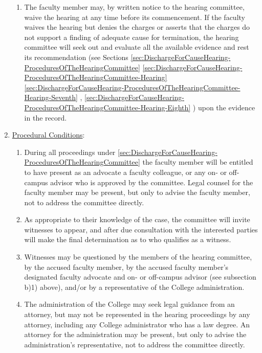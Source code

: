 \begin{enumerate}[label=\alph*)]
{\begin{enumerate}[label=\arabic*)]
								\item{The faculty member may, by written notice to the hearing committee, waive the hearing at any time before its commencement.  If the faculty waives the hearing but denies the charges or asserts that the charges do not support a finding of adequate cause for termination, the hearing committee will seek out and evaluate all the available evidence and rest its recommendation
									(see
									Sections
									\ref{sec:DischargeForCauseHearing-ProceduresOfTheHearingCommittee}
									\ref{sec:DischargeForCauseHearing-ProceduresOfTheHearingCommittee-Hearing}
									\ref{sec:DischargeForCauseHearing-ProceduresOfTheHearingCommittee-Hearing-Seventh}
									,
									\ref{sec:DischargeForCauseHearing-ProceduresOfTheHearingCommittee-Hearing-Eighth}
									)
									upon the evidence in the record.}
							\end{enumerate}
						}
						\item{\underline{Procedural Conditions}:
							\label{sec:DischargeForCauseHearing-ProceduresOfTheHearingCommittee-ProceduralConditions}
							\begin{enumerate}[label=\arabic*)]
								\item{
									\label{sec:DischargeForCauseHearing-ProceduresOfTheHearingCommittee-ProceduralConditions-First}
									During all proceedings under
									\ref{sec:DischargeForCauseHearing-ProceduresOfTheHearingCommittee}
									the faculty member will be entitled to have present as an advocate a faculty colleague, or any on- or off-campus advisor who is approved by the committee.  Legal counsel for the faculty member may be present, but only to advise the faculty member, not to address the committee directly.}
								\item{As appropriate to their knowledge of the case, the committee will invite witnesses to appear, and after due consultation with the interested parties will make the final determination as to who qualifies as a witness.}
								\item{Witnesses may be questioned by the members of the hearing committee, by the accused faculty member, by the accused faculty member's designated faculty advocate and on- or off-campus advisor (see subsection b)1) above), and/or by a representative of the College administration.}
								\item{The administration of the College may seek legal guidance from an attorney, but may not be represented in the hearing proceedings by any attorney, including any College administrator who has a law degree.  An attorney for the administration may be present, but only to advise the administration's representative, not to address the committee directly.}

\end{enumerate}}
\end{enumerate}
